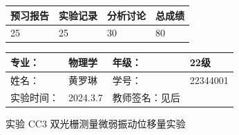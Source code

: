 \documentclass[dvipsnames, svgnames,a4paper,11pt]{article}
\begin{document}
	
	
	
	
	\begin{table}
		\renewcommand\arraystretch{1.7}
		\begin{tabularx}{\textwidth}{
				|X|X|X|X
				|X|X|X|X|}
			\hline
			\multicolumn{2}{|c|}{预习报告}&\multicolumn{2}{|c|}{实验记录}&\multicolumn{2}{|c|}{分析讨论}&\multicolumn{2}{|c|}{总成绩}\\
			\hline
			\LARGE25 & & \LARGE25 & & \LARGE30 & & \LARGE80 & \\
			\hline
		\end{tabularx}
	\end{table}
	
	\begin{table}
		\renewcommand\arraystretch{1.7}
		\begin{tabularx}{\textwidth}{|X|X|X|X|}
			\hline
			专业： &  物理学 &年级： & 22级\\
			\hline
			姓名： & 黄罗琳 & 学号： & 22344001\\
			\hline
			实验时间： & 2024.3.7 & 教师签名：见后 & \\
			\hline
		\end{tabularx}
	\end{table}
	
	\begin{center}
		\LARGE 实验 CC3 \quad 双光栅测量微弱振动位移量实验
	\end{center}
	
	
\end{document}
